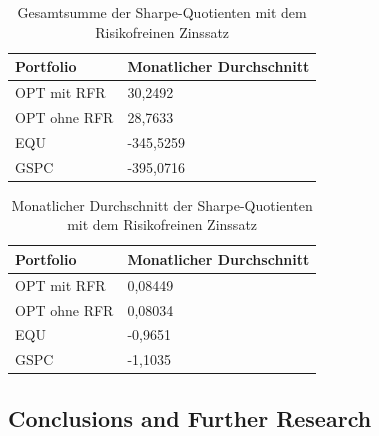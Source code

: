 \documentclass[12pt]{article}
\begin{document}
        \begin{table}[htp]
            \begin{center}
                
                \begin{tabular}{ | l | l | }

                    \hline
                    \textbf{Portfolio}   & \textbf{Monatlicher Durchschnitt} \\
                    \hline
                    OPT mit RFR          & 30,2492  \\          
                    OPT ohne RFR         & 28,7633 \\
                    EQU                  & -345,5259  \\              
                    GSPC                 & -395,0716  \\       
                            
                    \hline

                \end{tabular}
                \caption{Gesamtsumme der Sharpe-Quotienten mit dem Risikofreinen Zinssatz}
                \label{gs-sq-mit-rfz}

            \end{center}
        \end{table}

        \begin{table}[htp]
            \begin{center}
                
                \begin{tabular}{ | l | l | }

                    \hline
                    \textbf{Portfolio}   & \textbf{Monatlicher Durchschnitt} \\
                    \hline
                    OPT mit RFR          & 0,08449 \\      
                    OPT ohne RFR         & 0,08034 \\
                    EQU                  & -0,9651 \\            
                    GSPC                 & -1,1035 \\     
                            
                    \hline

                \end{tabular}
                \caption{Monatlicher Durchschnitt der Sharpe-Quotienten mit dem Risikofreinen Zinssatz}
                \label{md-sq-mit-rfz}

            \end{center}
        \end{table}

        
        \newpage \subsection{Conclusions and Further Research}

       
    
    
    \printbibliography[heading=bibintoc, title={References}]
\end{document}
